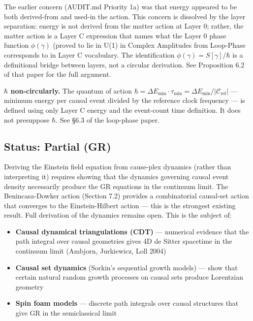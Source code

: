 \documentclass[11pt]{article}
\providecommand{\tightlist}{\setlength{\itemsep}{0pt}\setlength{\parskip}{0pt}}
\theoremstyle{definition}
\theoremstyle{remark}
\begin{document}
The earlier concern (AUDIT.md Priority 1a) was that energy appeared to
be both derived-from and used-in the action. This concern is dissolved
by the layer separation: energy is not derived from the matter action at
Layer 0; rather, the matter action is a Layer C expression that names
what the Layer 0 phase function \(\phi(\gamma)\) (proved to lie in U(1)
in Complex Amplitudes from Loop-Phase
corresponds to in Layer C vocabulary. The identification
\(\phi(\gamma) = S[\gamma]/\hbar\) is a definitional bridge between
layers, not a circular derivation. See Proposition 6.2 of that paper for
the full argument.

\textbf{\(\hbar\) non-circularly.} The quantum of action
\(\hbar = \Delta E_{\min} \cdot \tau_{\min} = \Delta E_{\min}/|\mathcal{C}_{\text{ref}}|\)
--- minimum energy per causal event divided by the reference clock
frequency --- is defined using only Layer C energy and the event-count
time definition. It does not presuppose \(\hbar\). See §6.3 of the
loop-phase paper.

\subsection{Status: Partial (GR)}\label{status-partial-gr}

Deriving the Einstein field equation from cause-plex dynamics (rather
than interpreting it) requires showing that the dynamics governing
causal event density necessarily produce the GR equations in the
continuum limit. The Benincasa-Dowker action (Section 7.2) provides a
combinatorial causal-set action that converges to the Einstein-Hilbert
action --- this is the strongest existing result. Full derivation of the
dynamics remains open. This is the subject of:

\begin{itemize}
\tightlist
\item
  \textbf{Causal dynamical triangulations (CDT)} --- numerical evidence
  that the path integral over causal geometries gives 4D de Sitter
  spacetime in the continuum limit (Ambjorn, Jurkiewicz, Loll 2004)
\item
  \textbf{Causal set dynamics} (Sorkin's sequential growth models) ---
  show that certain natural random growth processes on causal sets
  produce Lorentzian geometry
\item
  \textbf{Spin foam models} --- discrete path integrals over causal
  structures that give GR in the semiclassical limit
\end{itemize}
\end{document}
